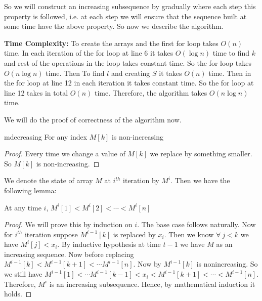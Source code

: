 So we will construct an increasing subsequence by gradually where each step this property is followed, i.e. at each step we will ensure that the sequence built at some time have the above property. So now we describe the algorithm. 
\begin{algorithm}
	\DontPrintSemicolon
\caption{$(A)$}
\end{algorithm}\parinf

\textbf{Time Complexity:} To create the arrays and the first for loop takes $O(n)$ time. In each iteration of the for loop at line 6 it takes $O(\log n)$ time to find $k$ and rest of the operations in the loop takes constant time. So the for loop takes $O(n\log n)$ time.  Then To find $l$ and creating $S$ it takes $O(n)$ time. Then in the for loop at line 12 in each iteration it takes constant time. So the for loop at line 12 takes in total $O(n)$ time. Therefore, the algorithm takes $O(n\log n)$ time. \parinn

We will do the proof of correctness of the algorithm now.
\begin{lemma}{}{mdecreasing}
	For any index $M[k]$ is non-increasing
\end{lemma}
\begin{proof}
	Every time we change a value of $M[k]$ we replace by something smaller. So $M[k]$ is non-increasing.
\end{proof}
We denote the state of array $M$ at $i^{th}$ iteration by $M^i$. Then we have the following lemma:

\begin{lemma}{}{}
At any time $i$, $M^i[1]< M^i[2]< \cdots< M^i[n]$
\end{lemma}
\begin{proof}
We will prove this by induction on $i$. The base case follows naturally. Now for $i^{th}$ iteration suppose $M^{i-1}[k]$ is replaced by $x_i$. Then we know $\forall \ j<k$ we have $M^i[j]< x_i$. By inductive hypothesis at time $t-1$ we have $M$ as an increasing sequence. Now before replacing $M^{i-1}[k]< M^{i-1}[k+1]< \cdots M^{i-1}[n]$. Now by  $M^{i-1}[k]$ is nonincreasing. So we still have $M^{i-1}[1]< \cdots M^{i-1}[k-1]< x_i < M^{i-1}[k+1]< \cdots < M^{i-1}[n]$. Therefore, $M^{i}$ is an increasing subsequence. Hence, by mathematical induction it holds.
\end{proof}

